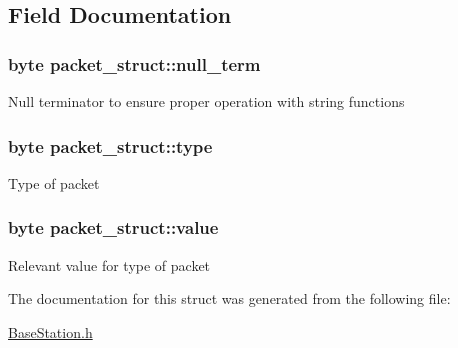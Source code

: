 \subsection{\-Field \-Documentation}
\hypertarget{structpacket__struct_a186f2116990358664c9b0db168d03265}{
\subsubsection[{null\-\_\-term}]{\setlength{\rightskip}{0pt plus 5cm}byte {\bf packet\-\_\-struct\-::null\-\_\-term}}}\label{structpacket__struct_a186f2116990358664c9b0db168d03265}
\-Null terminator to ensure proper operation with string functions \hypertarget{structpacket__struct_a0c99ddd42751de2947657294da9ea03b}{
\subsubsection[{type}]{\setlength{\rightskip}{0pt plus 5cm}byte {\bf packet\-\_\-struct\-::type}}}\label{structpacket__struct_a0c99ddd42751de2947657294da9ea03b}
\-Type of packet \hypertarget{structpacket__struct_a08939832a1beaf4beda91d0d2e084d41}{
\subsubsection[{value}]{\setlength{\rightskip}{0pt plus 5cm}byte {\bf packet\-\_\-struct\-::value}}}\label{structpacket__struct_a08939832a1beaf4beda91d0d2e084d41}
\-Relevant value for type of packet 

\-The documentation for this struct was generated from the following file\-:\begin{DoxyCompactItemize}
\item 
\hyperlink{BaseStation_8h}{\-Base\-Station.\-h}\end{DoxyCompactItemize}
